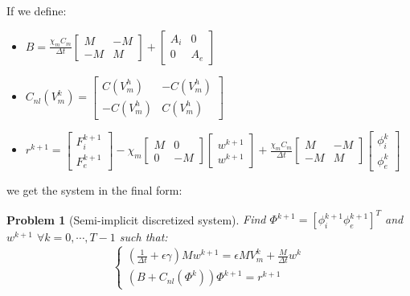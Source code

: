 \documentclass[a4paper,11pt]{article}
\newtheorem{problem}{Problem}
\begin{document}
\vspace{5mm}
\noindent If we define:
\begin{itemize}
\item $B=\frac{\chi_m C_m}{\Delta t} \begin{bmatrix} M &-M \\-M & M \end{bmatrix}+\begin{bmatrix} A_i & 0 \\ 0 & A_e \end{bmatrix}$
\item $C_{nl}(V_m^k)=\begin{bmatrix}C(V_m^h) & -C(V_m^h) \\ -C(V_m^h) & C(V_m^h) \end{bmatrix}$
\item $r^{k+1}=\begin{bmatrix} F_i^{k+1} \\ F_e^{k+1}\end{bmatrix}-\chi_m \begin{bmatrix}M & 0 \\ 0 & -M \end{bmatrix} \begin{bmatrix}w^{k+1} \\ w^{k+1} \end{bmatrix}+\frac{\chi_m C_m}{\Delta t} \begin{bmatrix} M &-M \\-M & M \end{bmatrix} \begin{bmatrix} \phi_i^k \\ \phi_e^k \end{bmatrix}$
\end{itemize} \vspace{5mm}
we get the system in the final form: 
\begin{problem}[Semi-implicit discretized system]
Find $\Phi^{k+1}=[\phi_i^{k+1} \phi_e^{k+1}]^T$ and $w^{k+1}$ $\forall k=0,\cdots,T-1$ such that:
\begin{equation}
\begin{cases}
(\frac{1}{\Delta t}+\epsilon \gamma)M w^{k+1}=\epsilon M V_m^k+\frac{M}{\Delta t} w^k \\
(B+C_{nl}(\Phi^k)) \Phi^{k+1}=r^{k+1}
\end{cases}
\end{equation} 
\end{problem}
\end{document}
